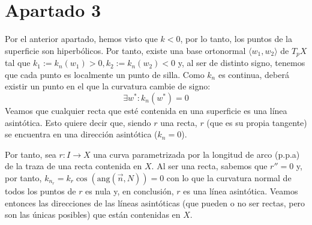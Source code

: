 \section{Apartado 3}
Por el anterior apartado, hemos visto que $k < 0$, por lo tanto, los puntos de
la superficie son hiperbólicos. Por tanto, existe una base ortonormal $\langle
w_1, w_2 \rangle$ de $T_pX$ tal que $k_1 := k_n \left( w_1 \right) > 0, k_2 :=
k_n \left( w_2 \right) < 0$ y, al ser de distinto signo, tenemos que cada punto
es localmente un punto de silla. Como $k_n$ es continua, deberá existir un punto
en el que la curvatura cambie de signo:
\[
\exists w^* : k_n\left( w^* \right) = 0
\]
Veamos que cualquier recta que esté contenida en una superficie es una línea
asintótica. Esto quiere decir que, siendo $r$ una recta, $r$ (que es su propia
tangente) se encuentra en una dirección asintótica ($k_n = 0$).

Por tanto, sea $r: I \rightarrow X$ una curva parametrizada por la longitud de
arco (p.p.a) de la traza de una recta contenida en $X$. Al ser una recta,
sabemos que $r'' = 0$ y, por tanto, $k_{n_r} = k_r \cos \left(
\mathrm{ang}\left( \overrightarrow{n}, N \right) \right) = 0$ con lo que la
curvatura normal de todos los puntos de $r$ es nula y, en conclusión, $r$ es una
línea asintótica. Veamos entonces las direcciones de las líneas asintóticas (que
pueden o no ser rectas, pero son las únicas posibles) que están contenidas en
$X$.

